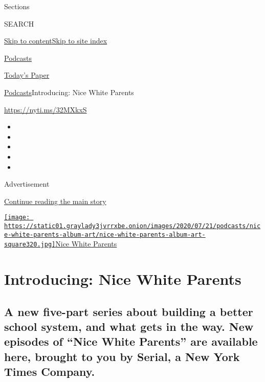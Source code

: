 Sections

SEARCH

\protect\hyperlink{site-content}{Skip to
content}\protect\hyperlink{site-index}{Skip to site index}

\href{https://www.nytimes3xbfgragh.onion/spotlight/podcasts}{Podcasts}

\href{https://myaccount.nytimes3xbfgragh.onion/auth/login?response_type=cookie\&client_id=vi}{}

\href{https://www.nytimes3xbfgragh.onion/section/todayspaper}{Today's
Paper}

\href{/spotlight/podcasts}{Podcasts}\textbar{}Introducing: Nice White
Parents

\url{https://nyti.ms/32MXkxS}

\begin{itemize}
\item
\item
\item
\item
\item
\end{itemize}

Advertisement

\protect\hyperlink{after-top}{Continue reading the main story}

\href{https://www.nytimes3xbfgragh.onion/column/nice-white-parents}{\texttt{[image: https://static01.graylady3jvrrxbe.onion/images/2020/07/21/podcasts/nice-white-parents-album-art/nice-white-parents-album-art-square320.jpg]}Nice
White Parents}

\hypertarget{introducing-nice-white-parents}{%
\section{Introducing: Nice White
Parents}\label{introducing-nice-white-parents}}

\hypertarget{a-new-five-part-series-about-building-a-better-school-system-and-what-gets-in-the-way-new-episodes-of-nice-white-parents-are-available-here-brought-to-you-by-serial-a-new-york-times-company}{%
\subsection{A new five-part series about building a better school
system, and what gets in the way. New episodes of ``Nice White Parents''
are available here, brought to you by Serial, a New York Times
Company.}\label{a-new-five-part-series-about-building-a-better-school-system-and-what-gets-in-the-way-new-episodes-of-nice-white-parents-are-available-here-brought-to-you-by-serial-a-new-york-times-company}}

